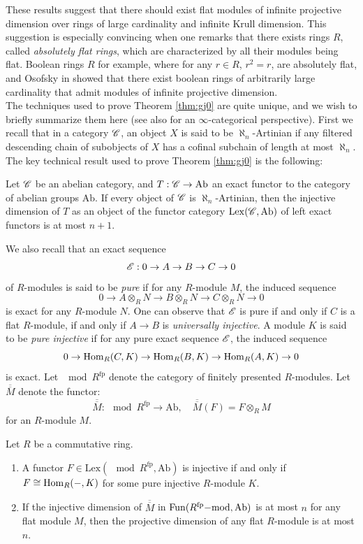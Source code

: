 These results suggest that there should exist flat modules of infinite projective dimension over rings of large cardinality and infinite Krull dimension.
This suggestion is especially convincing when one remarks that there exists rings $R$, called \textit{absolutely flat rings}, which are characterized by all their modules being flat.
Boolean rings $R$ for example, where for any $r\in R$, $r^2=r$, are absolutely flat, and Osofsky in \cite{osofsky} showed that there exist boolean rings of arbitrarily large cardinality
that admit modules of infinite projective dimension.\\
\indent The techniques used to prove Theorem \ref{thm:gj0} are quite unique, and we wish to briefly summarize them here (see also \cite{jiangdescendable} for an $\infty$-categorical perspective). First 
we recall that in a category $\mathscr{C}$, an object $X$ is said to be $\aleph_n$-Artinian if any filtered descending chain of subobjects of $X$ 
has a cofinal subchain of length at most $\aleph_n$. The key technical result used to prove Theorem \ref{thm:gj0} is the following:
\begin{theorem}\label{thm:gj1}
Let $\mathscr{C}$ be an abelian category, and $T:\mathscr{C} \rightarrow \mathrm{Ab}$ an exact functor to the category of abelian groups $\mathrm{Ab}$. If every object of $\mathscr{C}$ is $\aleph_n$-Artinian,
then the injective dimension of $T$ as an object of the functor category $\mathrm{Lex}(\mathscr{C}, \mathrm{Ab})$ of left exact functors is at most $n+1$. 
\cite[Theorem 6.5]{gj}
\end{theorem}
We also recall that an exact sequence 
\[\mathscr{E}: 0 \rightarrow A \rightarrow B \rightarrow C \rightarrow 0\]
of $R$-modules is said to be \textit{pure} if for any $R$-module $M$, the induced sequence
\[0 \to A \otimes_R N \to B \otimes_R N \to C \otimes_R N \to 0\]
is exact for any $R$-module $N$. One can observe that $\mathscr{E}$ is pure if and only if $C$ is a flat $R$-module, if and only if $A \to B$ is \textit{universally injective}.
 A module $K$ is said to be \textit{pure injective} if for any pure exact sequence $\mathscr{E}$, the induced sequence
\[0 \rightarrow \operatorname{Hom}_R(C, K) \rightarrow \operatorname{Hom}_R(B, K) \rightarrow \operatorname{Hom}_R(A, K) \rightarrow 0\]
is exact. Let $\mod{R^{\mathrm{fp}}}$ denote the category of finitely presented $R$-modules. Let $\overline{\overline{M}}$ denote the functor:
\[\overline{\overline{M}}: \mod{R^{\mathrm{fp}}} \to \mathrm{Ab}, \quad  \overline{\overline{M}}(F) = F \otimes_R M\]
for an $R$-module $M$.
\begin{theorem}\label{thm:gj2}
Let $R$ be a commutative ring.
\begin{enumerate}
\item [(i)] A functor $F \in \mathrm{Lex}(\mod{R^{\mathrm{fp}}}, \mathrm{Ab})$ is injective if and only if $F \cong \operatorname{Hom}_R(-, K)$ for some pure injective $R$-module $K$. 
\cite[Proposition 1.2]{gj}
\item [(ii)] If the injective dimension of $\overline{\overline{M}}$ in $\operatorname{Fun}({R^{\mathrm{fp}}}\mathrm{-mod}, \mathrm{Ab})$ is at most $n$ for any flat module $M$,
then the projective dimension of any flat $R$-module is at most $n$. \cite[Proposition 3.8]{gj}
\end{enumerate}
\end{theorem}
